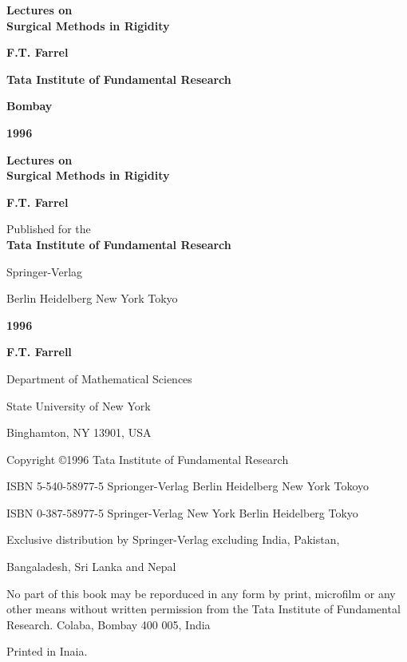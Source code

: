 \thispagestyle{empty}
\begin{center}
{\Large\bf Lectures on}\\[5pt]
{\Large\bf Surgical Methods in Rigidity}\\
\vfill

{\large\bf F.T. Farrel}\\
\vfill

{\bf  Tata Institute of Fundamental Research}

{\bf  Bombay}

{\bf  1996}
\end{center}

\eject

\thispagestyle{empty}
\begin{center}
{\Large\bf Lectures on }\\[5pt]
{\Large\bf Surgical Methods in Rigidity}\\
\vfill

{\large\bf  F.T. Farrel}\\
\vfill


Published for the\\[10pt]
{\bf Tata Institute of Fundamental Research}

Springer-Verlag

Berlin Heidelberg New York Tokyo

{\bf  1996}
\end{center}

\eject

\thispagestyle{empty}
\begin{flushleft}
\vfill
\textbf{F.T. Farrell}

Department of Mathematical Sciences

State University of New York

Binghamton, NY 13901, USA

\vfill

Copyright \copyright 1996 Tata Institute of Fundamental Research

ISBN 5-540-58977-5 Sprionger-Verlag Berlin Heidelberg New York Tokoyo

ISBN 0-387-58977-5 Springer-Verlag New York Berlin Heidelberg Tokyo
\bigskip

Exclusive distribution by Springer-Verlag excluding India, Pakistan,

Bangaladesh, Sri Lanka and Nepal
\bigskip


No part of this book may be reporduced in any form by print,
microfilm or any other means without written permission from the
Tata Institute of Fundamental Research. Colaba, Bombay 400 005, India


Printed in Inaia.
\end{flushleft}
